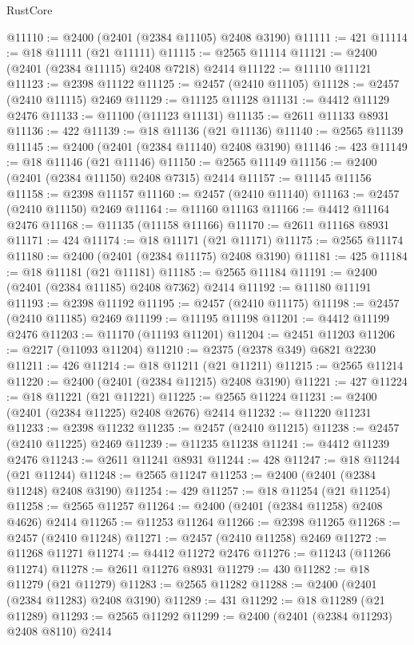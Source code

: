 \begin{lexlean}{RustCore}
\begin{coremodule}
@11110 := @2400 (@2401 (@2384 @11105) @2408 @3190)
@11111 := 421
@11114 := @18 @11111 (@21 @11111)
@11115 := @2565 @11114
@11121 := @2400 (@2401 (@2384 @11115) @2408 @7218) @2414
@11122 := @11110 @11121
@11123 := @2398 @11122
@11125 := @2457 (@2410 @11105)
@11128 := @2457 (@2410 @11115) @2469
@11129 := @11125 @11128
@11131 := @4412 @11129 @2476
@11133 := @11100 (@11123 @11131)
@11135 := @2611 @11133 @8931
@11136 := 422
@11139 := @18 @11136 (@21 @11136)
@11140 := @2565 @11139
@11145 := @2400 (@2401 (@2384 @11140) @2408 @3190)
@11146 := 423
@11149 := @18 @11146 (@21 @11146)
@11150 := @2565 @11149
@11156 := @2400 (@2401 (@2384 @11150) @2408 @7315) @2414
@11157 := @11145 @11156
@11158 := @2398 @11157
@11160 := @2457 (@2410 @11140)
@11163 := @2457 (@2410 @11150) @2469
@11164 := @11160 @11163
@11166 := @4412 @11164 @2476
@11168 := @11135 (@11158 @11166)
@11170 := @2611 @11168 @8931
@11171 := 424
@11174 := @18 @11171 (@21 @11171)
@11175 := @2565 @11174
@11180 := @2400 (@2401 (@2384 @11175) @2408 @3190)
@11181 := 425
@11184 := @18 @11181 (@21 @11181)
@11185 := @2565 @11184
@11191 := @2400 (@2401 (@2384 @11185) @2408 @7362) @2414
@11192 := @11180 @11191
@11193 := @2398 @11192
@11195 := @2457 (@2410 @11175)
@11198 := @2457 (@2410 @11185) @2469
@11199 := @11195 @11198
@11201 := @4412 @11199 @2476
@11203 := @11170 (@11193 @11201)
@11204 := @2451 @11203
@11206 := @2217 (@11093 @11204)
@11210 := @2375 (@2378 @349) @6821 @2230
@11211 := 426
@11214 := @18 @11211 (@21 @11211)
@11215 := @2565 @11214
@11220 := @2400 (@2401 (@2384 @11215) @2408 @3190)
@11221 := 427
@11224 := @18 @11221 (@21 @11221)
@11225 := @2565 @11224
@11231 := @2400 (@2401 (@2384 @11225) @2408 @2676) @2414
@11232 := @11220 @11231
@11233 := @2398 @11232
@11235 := @2457 (@2410 @11215)
@11238 := @2457 (@2410 @11225) @2469
@11239 := @11235 @11238
@11241 := @4412 @11239 @2476
@11243 := @2611 @11241 @8931
@11244 := 428
@11247 := @18 @11244 (@21 @11244)
@11248 := @2565 @11247
@11253 := @2400 (@2401 (@2384 @11248) @2408 @3190)
@11254 := 429
@11257 := @18 @11254 (@21 @11254)
@11258 := @2565 @11257
@11264 := @2400 (@2401 (@2384 @11258) @2408 @4626) @2414
@11265 := @11253 @11264
@11266 := @2398 @11265
@11268 := @2457 (@2410 @11248)
@11271 := @2457 (@2410 @11258) @2469
@11272 := @11268 @11271
@11274 := @4412 @11272 @2476
@11276 := @11243 (@11266 @11274)
@11278 := @2611 @11276 @8931
@11279 := 430
@11282 := @18 @11279 (@21 @11279)
@11283 := @2565 @11282
@11288 := @2400 (@2401 (@2384 @11283) @2408 @3190)
@11289 := 431
@11292 := @18 @11289 (@21 @11289)
@11293 := @2565 @11292
@11299 := @2400 (@2401 (@2384 @11293) @2408 @8110) @2414

\end{coremodule}
\end{lexlean}
